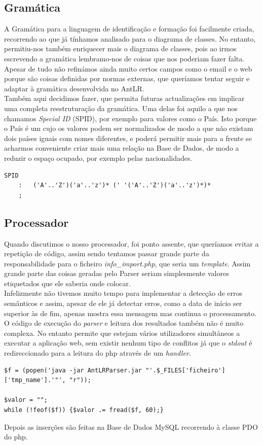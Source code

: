 \documentclass[a4paper,11pt,openright,openbib]{article}
\begin{document}
\subsection{Gramática}
A Gramática para a linguagem de identificação e formação foi facilmente criada, recorrendo ao que já tínhamos analisado para o diagrama de classes. No entanto, permitiu-nos também enriquecer mais o diagrama de classes, pois ao irmos escrevendo a gramática lembramo-nos de coisas que nos poderiam fazer falta.\\
Apesar de tudo não refinámos ainda muito certos campos como o email e o web porque são coisas definidas por normas externas, que queríamos tentar seguir e adaptar à gramática desenvolvida no AntLR.\\
Também aqui decidimos fazer, que permita futuras actualizações em implicar uma completa reestruturação da gramática. Uma delas foi aquilo a que nos chamamos \emph{Special ID} (SPID), por exemplo para valores como o País. Isto porque o País é um cujo os valores podem ser normalizados de modo a que não existam dois países iguais com nomes diferentes, e poderá permitir mais para a frente se acharmos conveniente criar mais uma relação na Base de Dados, de modo a reduzir o espaço ocupado, por exemplo pelas nacionalidades.
\begin{verbatim}
SPID
	:	('A'..'Z')('a'..'z')* (' '('A'..'Z')('a'..'z')*)*
	;
\end{verbatim}
\subsection{Processador}
Quando discutimos o nosso processador, foi ponto assente, que queríamos evitar a repetição de código, assim sendo tentamos passar grande parte da responsabilidade para o ficheiro \emph{info\_import.php}, que seria um \emph{template}. Assim grande parte das coisas geradas pelo Parser seriam simplesmente valores etiquetados que ele saberia onde colocar.\\
Infelizmente não tivemos muito tempo para implementar a detecção de erros semânticos e assim, apesar de ele já detectar erros, como a data de início ser superior às de fim, apenas mostra essa mensagem mas continua o processamento.\\

O código de execução do \emph{parser} e leitura dos resultados também não é muito complexa. No entanto permite que estejam vários utilizadores simultâneos a executar a aplicação web, sem existir nenhum tipo de conflitos já que o \emph{stdout} é redireccionado para a leitura do php através de um \emph{handler}.
\begin{verbatim}
$f = (popen('java -jar AntLRParser.jar "'.$_FILES['ficheiro']['tmp_name'].'"', "r"));

$valor = "";
while (!feof($f)) {$valor .= fread($f, 60);}
\end{verbatim}
Depois as inserções são feitas na Base de Dados MySQL recorrendo à classe PDO do php.
\end{document}
